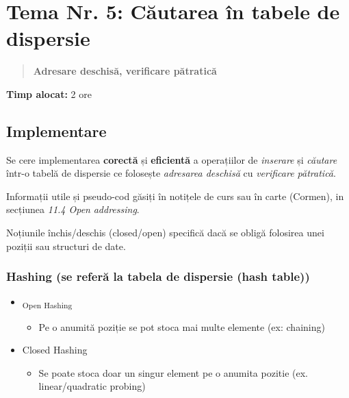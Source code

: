 \documentclass[../ro-fa-lab.tex]{subfiles}
\begin{document}
\section{\texorpdfstring{\textbf{Tema Nr. 5: Căutarea în tabele de dispersie}}{Tema Nr. 5: Căutarea în tabele de dispersie}}\label{assign5}

\begin{quote}

\textbf{Adresare deschisă, verificare pătratică}
\end{quote}

\textbf{Timp alocat:} 2 ore

\subsection{Implementare}\label{implementare}

Se cere implementarea \textbf{corectă} și \textbf{eficientă} a
operațiilor de \emph{inserare} și \emph{căutare} într-o tabelă de
dispersie ce folosește \emph{adresarea deschisă} cu \emph{verificare
pătratică}.

Informații utile și pseudo-cod găsiți în notițele de curs sau în carte
(Cormen), in secțiunea \emph{11.4 Open} \emph{addressing}.

Noțiunile închis/deschis (closed/open) specifică dacă se obligă
folosirea unei poziții sau structuri de date.

\subsubsection{Hashing (se referă la tabela de dispersie (hash
table))}\label{hashing-se-referux103-la-tabela-de-dispersie-hash-table}

\begin{itemize}
\item
  \textsubscript{Open Hashing}

  \begin{itemize}
  \item
    Pe o anumită poziție se pot stoca mai multe elemente
    (ex: chaining)
  \end{itemize}
\item
  Closed Hashing

  \begin{itemize}
  \item
    Se poate stoca doar un singur element pe o anumita
    pozitie (ex. linear/quadratic probing)
  \end{itemize}
\end{itemize}
\end{document}
